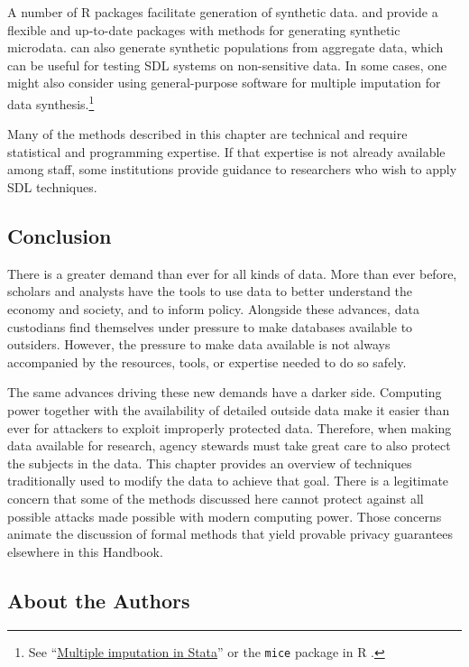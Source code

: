 \documentclass[
]{WileySix}
\begin{document}
A number of R packages facilitate generation of synthetic data. \citet{raab_practical_2016} and \citet{nowok_synthpop_2016} provide a flexible and up-to-date packages with methods for generating synthetic microdata. \citet{templ_simpop_2019} can also generate synthetic populations from aggregate data, which can be useful for testing SDL systems on non-sensitive data. In some cases, one might also consider using general-purpose software for multiple imputation for data synthesis.\footnote{See ``\href{https://stats.idre.ucla.edu/stata/seminars/mi_in_stata_pt1_new/}{Multiple imputation in Stata}'' or the \texttt{mice} package in R \citep{buuren_mice_2011}.}

Many of the methods described in this chapter are technical and require statistical and programming expertise. If that expertise is not already available among staff, some institutions provide guidance to researchers who wish to apply SDL techniques.

\hypertarget{conclusion}{%
\subsection{Conclusion}\label{conclusion}}

There is a greater demand than ever for all kinds of data. More than ever before, scholars and analysts have the tools to use data to better understand the economy and society, and to inform policy. Alongside these advances, data custodians find themselves under pressure to make databases available to outsiders. However, the pressure to make data available is not always accompanied by the resources, tools, or expertise needed to do so safely.

The same advances driving these new demands have a darker side. Computing power together with the availability of detailed outside data make it easier than ever for attackers to exploit improperly protected data. Therefore, when making data available for research, agency stewards must take great care to also protect the subjects in the data. This chapter provides an overview of techniques traditionally used to modify the data to achieve that goal. There is a legitimate concern that some of the methods discussed here cannot protect against all possible attacks made possible with modern computing power. Those concerns animate the discussion of formal methods that yield provable privacy guarantees elsewhere in this Handbook.

\hypertarget{about-the-authors}{%
\subsection*{About the Authors}\label{about-the-authors}}
\end{document}
